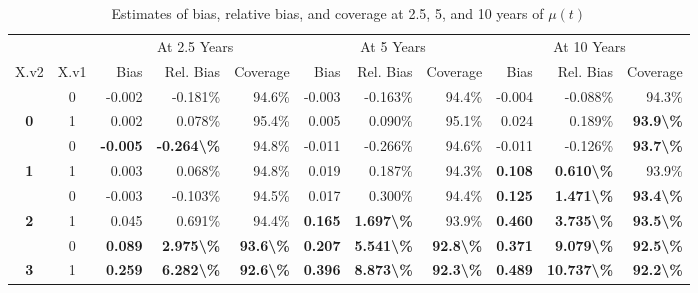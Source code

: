 \begin{table}

\caption{Estimates of bias, relative bias, and coverage at 2.5, 5, and 10 years of $\mu(t)$}
\centering
\begin{tabular}[t]{>{}ccrrrrrrrrr}
\toprule
\multicolumn{2}{c}{ } & \multicolumn{3}{c}{At 2.5 Years} & \multicolumn{3}{c}{At 5 Years} & \multicolumn{3}{c}{At 10 Years} \\
\cmidrule(l{3pt}r{3pt}){3-5} \cmidrule(l{3pt}r{3pt}){6-8} \cmidrule(l{3pt}r{3pt}){9-11}
X.v2 & X.v1 & Bias & Rel. Bias & Coverage & Bias & Rel. Bias & Coverage & Bias & Rel. Bias & Coverage\\
\midrule
 & 0 & -0.002 & -0.181\% & 94.6\% & -0.003 & -0.163\% & 94.4\% & -0.004 & -0.088\% & 94.3\%\\

\multirow[t]{-2}{*}{\centering\arraybackslash \textbf{0}} & 1 & 0.002 & 0.078\% & 95.4\% & 0.005 & 0.090\% & 95.1\% & 0.024 & 0.189\% & \textbf{93.9\textbackslash{}\%}\\

 & 0 & \textbf{-0.005} & \textbf{-0.264\textbackslash{}\%} & 94.8\% & -0.011 & -0.266\% & 94.6\% & -0.011 & -0.126\% & \textbf{93.7\textbackslash{}\%}\\

\multirow[t]{-2}{*}{\centering\arraybackslash \textbf{1}} & 1 & 0.003 & 0.068\% & 94.8\% & 0.019 & 0.187\% & 94.3\% & \textbf{ 0.108} & \textbf{ 0.610\textbackslash{}\%} & 93.9\%\\

 & 0 & -0.003 & -0.103\% & 94.5\% & 0.017 & 0.300\% & 94.4\% & \textbf{ 0.125} & \textbf{ 1.471\textbackslash{}\%} & \textbf{93.4\textbackslash{}\%}\\

\multirow[t]{-2}{*}{\centering\arraybackslash \textbf{2}} & 1 & 0.045 & 0.691\% & 94.4\% & \textbf{ 0.165} & \textbf{ 1.697\textbackslash{}\%} & 93.9\% & \textbf{ 0.460} & \textbf{ 3.735\textbackslash{}\%} & \textbf{93.5\textbackslash{}\%}\\

\rule{0pt}{4ex}
 & 0 & \textbf{ 0.089} & \textbf{ 2.975\textbackslash{}\%} & \textbf{93.6\textbackslash{}\%} & \textbf{ 0.207} & \textbf{ 5.541\textbackslash{}\%} & \textbf{92.8\textbackslash{}\%} & \textbf{ 0.371} & \textbf{ 9.079\textbackslash{}\%} & \textbf{92.5\textbackslash{}\%}\\

\multirow[t]{-2}{*}{\centering\arraybackslash \textbf{3}} & 1 & \textbf{ 0.259} & \textbf{ 6.282\textbackslash{}\%} & \textbf{92.6\textbackslash{}\%} & \textbf{ 0.396} & \textbf{ 8.873\textbackslash{}\%} & \textbf{92.3\textbackslash{}\%} & \textbf{ 0.489} & \textbf{10.737\textbackslash{}\%} & \textbf{92.2\textbackslash{}\%}\\
\bottomrule
\end{tabular}
\end{table}
